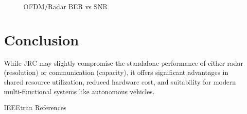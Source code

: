 \documentclass[conference]{IEEEtran}
\begin{document}
\begin{figure}[H]
\centering
{}
\caption{OFDM/Radar BER vs SNR}
\end{figure} 





\section {Conclusion}
While JRC may slightly compromise the standalone performance of either radar (resolution) or communication (capacity), it offers significant advantages in shared resource utilization, reduced hardware cost, and suitability for modern multi-functional systems like autonomous vehicles.


	 {IEEEtran}
	 {References}
	
  
\end{document}
